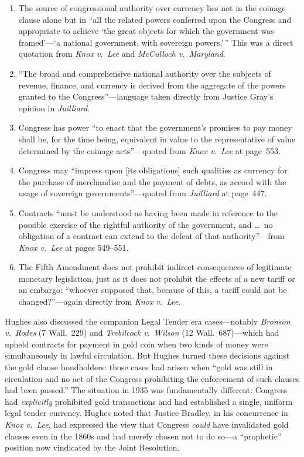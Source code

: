 \documentclass[12pt]{article}
\begin{document}
\begin{enumerate}

\item The source of congressional authority over currency lies not in
the coinage clause alone but in ``all the related powers conferred upon
the Congress and appropriate to achieve `the great objects for which the
government was framed'---`a national government, with sovereign
powers.'\,'' This was a direct quotation from \textit{Knox v.\ Lee} and
\textit{McCulloch v.\ Maryland}.

\item ``The broad and comprehensive national authority over the subjects
of revenue, finance, and currency is derived from the aggregate of the
powers granted to the Congress''---language taken directly from Justice
Gray's opinion in \textit{Juilliard}.

\item Congress has power ``to enact that the government's promises to
pay money shall be, for the time being, equivalent in value to the
representative of value determined by the coinage acts''---quoted from
\textit{Knox v.\ Lee} at page~553.

\item Congress may ``impress upon [its obligations] such qualities as
currency for the purchase of merchandise and the payment of debts, as
accord with the usage of sovereign governments''---quoted from
\textit{Juilliard} at page~447.

\item Contracts ``must be understood as having been made in reference to
the possible exercise of the rightful authority of the government, and
\ldots\ no obligation of a contract can extend to the defeat of that
authority''---from \textit{Knox v.\ Lee} at pages 549--551.

\item The Fifth Amendment does not prohibit indirect consequences of
legitimate monetary legislation, just as it does not prohibit the
effects of a new tariff or an embargo: ``whoever supposed that, because
of this, a tariff could not be changed?''---again directly from
\textit{Knox v.\ Lee}.

\end{enumerate}

Hughes also discussed the companion Legal Tender era cases---notably
\textit{Bronson v.\ Rodes} (7 Wall.\ 229) and \textit{Trebilcock v.\
Wilson} (12 Wall.\ 687)---which had upheld contracts for payment in
gold coin when two kinds of money were simultaneously in lawful
circulation. But Hughes turned these decisions against the gold clause
bondholders: those cases had arisen when ``gold was still in circulation
and no act of the Congress prohibiting the enforcement of such clauses
had been passed.'' The situation in 1935 was fundamentally different:
Congress had \textit{explicitly} prohibited gold transactions and had
established a single, uniform legal tender currency. Hughes noted that
Justice Bradley, in his concurrence in \textit{Knox v.\ Lee}, had
expressed the view that Congress \textit{could} have invalidated gold
clauses even in the 1860s and had merely chosen not to do so---a
``prophetic'' position now vindicated by the Joint Resolution.
\end{document}
